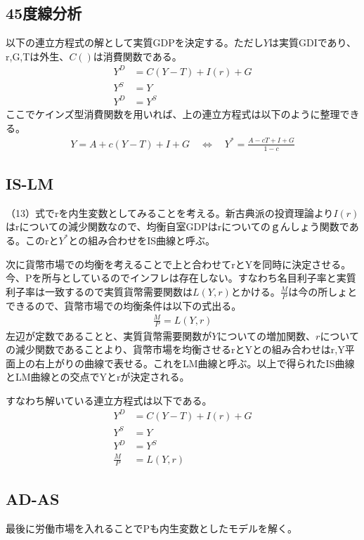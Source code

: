 \documentclass{jsarticle}
\begin{document}
\subsection{45度線分析}
以下の連立方程式の解として実質GDPを決定する。ただし$Y$は実質GDIであり、r,G,Tは外生、$C( )$は消費関数である。
\begin{align*}
	Y^D &= C(Y - T) + I(r) + G \\
	Y^S &= Y\\
	Y^D &= Y^S
\end{align*}
ここでケインズ型消費関数を用いれば、上の連立方程式は以下のように整理できる。
\begin{align}
	Y = A + c(Y - T) + I + G \quad \Leftrightarrow\quad Y^* = \frac{A - cT + I + G}{1 -c}
\end{align}

\subsection{IS-LM}
（13）式でrを内生変数としてみることを考える。新古典派の投資理論より$I(r)$はrについての減少関数なので、均衡自室GDPはrについてのｇんしょう関数である。このrと$Y^*$との組み合わせをIS曲線と呼ぶ。

次に貨幣市場での均衡を考えることで上と合わせてrとYを同時に決定させる。今、Pを所与としているのでインフレは存在しない。すなわち名目利子率と実質利子率は一致するので実質貨幣需要関数は$L(Y, r)$とかける。$\frac{M}{P}$は今の所しょとできるので、貨幣市場での均衡条件は以下の式出る。
\begin{align}
	\frac{M}{P} = L(Y, r)
\end{align}
左辺が定数であることと、実質貨幣需要関数が$Y$についての増加関数、$r$についての減少関数であることより、貨幣市場を均衡させるrとYとの組み合わせはr,Y平面上の右上がりの曲線で表せる。これをLM曲線と呼ぶ。以上で得られたIS曲線とLM曲線との交点でYとrが決定される。

すなわち解いている連立方程式は以下である。
\begin{align*}
	Y^D &= C(Y - T) + I(r) + G \\
	Y^S &= Y\\
	Y^D &= Y^S\\
	\frac{M}{P} &= L(Y, r)
\end{align*}

\subsection{AD-AS}
最後に労働市場を入れることでPも内生変数としたモデルを解く。
\end{document}
